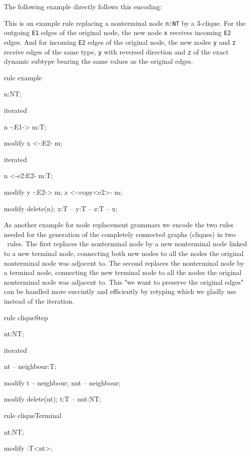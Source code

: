 The following example directly follows this encoding:

  \begin{example}
This is an example rule replacing a nonterminal node \texttt{n:NT} by a 3-clique.
For the outgoing \texttt{E1} edges of the original node, the new node \texttt{x} receives incoming \texttt{E2} edges.
And for incoming \texttt{E2} edges of the original node, the new nodes \texttt{y} and \texttt{z} receive edges of the same type, \texttt{y} with reversed direction and \texttt{z} of the exact dynamic subtype bearing the same values as the original edges.
    \begin{grgen}
rule example
{
  n:NT;

  iterated {
    n -:E1-> m:T;

    modify {
      x <-:E2- m;
    }
  }

  iterated {
    n <-e2:E2- m:T;

    modify {
      y -:E2-> m;
      z <-:copy<e2>- m;
    }
  }

  modify {
    delete(n);
    x:T -- y:T -- z:T -- x;
  }
}
    \end{grgen}
  \end{example}

As another example for node replacement grammars we encode the two rules needed for the generation of the completely connected graphs (cliques) in two \GrG~rules. The first replaces the nonterminal node by a new nonterminal node linked to a new terminal node, connecting both new nodes to all the nodes the original nonterminal node was adjacent to. The second replaces the nonterminal node by a terminal node, connecting the new terminal node to all the nodes the original nonterminal node was adjacent to. This "we want to preserve the original edges" can be handled more succintly and efficiently by retyping which we gladly use instead of the iteration.

  \begin{example}
    \begin{grgen}
rule cliqueStep
{
  nt:NT;

  iterated {
    nt -- neighbour:T;

    modify {
      t -- neighbour;
      nnt -- neighbour;
    }
  }

  modify {
    delete(nt);
    t:T -- nnt:NT;
  }
}

rule cliqueTerminal
{
  nt:NT;

  modify {
    :T<nt>;
  }
}
    \end{grgen}
  \end{example}

